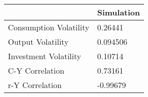 \begin{tabular}{ll}
& Simulation \\ 
\hline 
Consumption Volatility & 0.26441 \\ 
Output Volatility & 0.094506 \\ 
Investment Volatility & 0.10714 \\ 
C-Y Correlation & 0.73161 \\ 
r-Y Correlation & -0.99679 \\ 
\hline 
\end{tabular}
